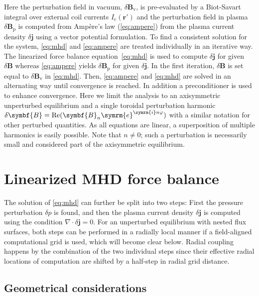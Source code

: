 \documentclass[a4paper, 10pt, english]{article}
\let\temp\vartheta
\let\vartheta\theta
\let\theta\temp
\let\temp\varphi
\let\varphi\phi
\let\phi\temp
\let\vec\symbf
\newcommand*\e{\ensuremath{\symrm{e}}}
\newcommand*\im{\ensuremath{\symrm{i}}}
\DeclareMathOperator\Real{Re}
\begin{document}
Here the perturbation field in vacuum, $\delta \vec{B}_{\text{v}}$, is pre-evaluated by a Biot-Savart integral over external coil currents $I_{\text{c}}(\vec{r}')$ and the perturbation field in plasma $\delta \vec{B}_{\text{p}}$ is computed from Ampère's law (\ref{eq:ampere}) from the plasma current density $\delta \vec{j}$ using a vector potential formulation. To find a consistent solution for the system, \cref{eq:mhd} and \cref{eq:ampere} are treated individually in an iterative way. The linearized force balance equation~\eqref{eq:mhd} is used to compute $\delta \vec{j}$ for given $\delta \vec{B}$ whereas \cref{eq:ampere} yields $\delta \vec{B}_{\text{p}}$ for given $\delta \vec{j}$. In the first iteration, $\delta \vec{B}$ is set equal to $\delta \vec{B}_{\text{v}}$ in \cref{eq:mhd}. Then, \cref{eq:ampere} and \cref{eq:mhd} are solved in an alternating way until convergence is reached. In addition a preconditioner is used to enhance convergence. Here we limit the analysis to an axisymmetric unperturbed equilibrium and a single toroidal perturbation harmonic $\delta \vec{B} = \Real (\vec{B}_{n} \e^{\im n \phi})$ with a similar notation for other perturbed quantities. As all equations are linear, a superposition of multiple harmonics is easily possible. Note that $n \neq 0$; such a perturbation is necessarily small and considered part of the axisymmetric equilibrium.

\section{Linearized MHD force balance}

The solution of \cref{eq:mhd} can further be split into two steps: First the pressure perturbation $\delta p$ is found, and then the plasma current density $\delta \vec{j}$ is computed using the condition $\nabla \cdot \delta \vec{j} = 0$. For an unperturbed equilibrium with nested flux surfaces, both steps can be performed in a radially local manner if a field-aligned computational grid is used, which will become clear below. Radial coupling happens by the combination of the two individual steps since their effective radial locations of computation are shifted by a half-step in radial grid distance.

\subsection{Geometrical considerations}
\end{document}
